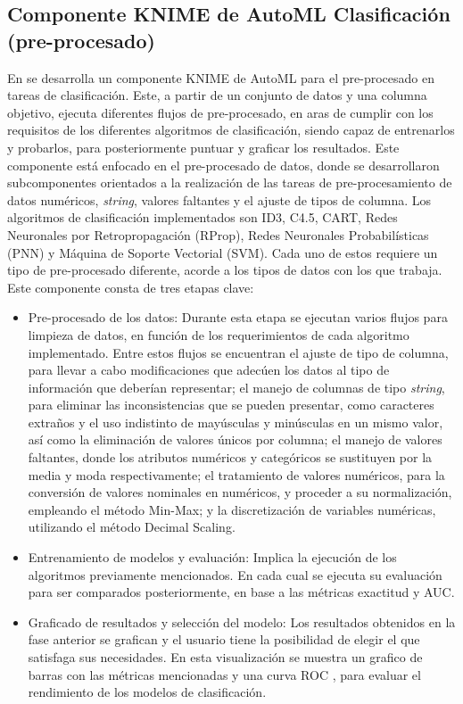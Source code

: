\subsection{Componente KNIME de AutoML Clasificación (pre-procesado)}\label{sec:componente-knime-de-automl-clasificacion-pre-procesado}
En \citep{Carrazana2022} se desarrolla un componente KNIME de AutoML para el pre-procesado en tareas de clasificación. Este, a partir de un conjunto de datos y una columna objetivo, ejecuta diferentes flujos de pre-procesado, en aras de cumplir con los requisitos de los diferentes algoritmos de clasificación, siendo capaz de entrenarlos y probarlos, para posteriormente puntuar y graficar los resultados. Este componente está enfocado en el pre-procesado de datos, donde se desarrollaron subcomponentes orientados a la realización de las tareas de pre-procesamiento de datos numéricos, \textit{string}, valores faltantes y el ajuste de tipos de columna. Los algoritmos de clasificación implementados son ID3, C4.5, CART, Redes Neuronales por Retropropagación (RProp), Redes Neuronales Probabilísticas (PNN) y Máquina de Soporte Vectorial (SVM). Cada uno de estos requiere un tipo de pre-procesado diferente, acorde a los tipos de datos con los que trabaja. Este componente consta de tres etapas clave:

\begin{itemize}
	\item Pre-procesado de los datos: Durante esta etapa se ejecutan varios flujos para limpieza de datos, en función de los requerimientos de cada algoritmo implementado. Entre estos flujos se encuentran el ajuste de tipo de columna, para llevar a cabo modificaciones que adecúen los datos al tipo de información que deberían representar; el manejo de columnas de tipo \textit{string}, para eliminar las inconsistencias que se pueden presentar, como caracteres extraños y el uso indistinto de mayúsculas y minúsculas en un mismo valor, así como la eliminación de valores únicos por columna; el manejo de valores faltantes, donde los atributos numéricos y categóricos se sustituyen por la media y moda respectivamente; el tratamiento de valores numéricos, para la conversión de valores nominales en numéricos, y proceder a su normalización, empleando el método Min-Max; y la discretización de variables numéricas, utilizando el método Decimal Scaling.
	\item Entrenamiento de modelos y evaluación: Implica la ejecución de los algoritmos previamente mencionados. En cada cual se ejecuta su evaluación para ser comparados posteriormente, en base a las métricas exactitud y AUC.
	\item Graficado de resultados y selección del modelo: Los resultados obtenidos en la fase anterior se grafican y  el usuario tiene la posibilidad de elegir el que satisfaga sus necesidades. En esta visualización se muestra un grafico de barras con las métricas mencionadas y una curva ROC , para evaluar el rendimiento de los modelos de clasificación. 
\end{itemize}

